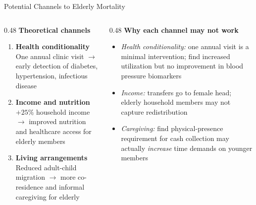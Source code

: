 \documentclass[aspectratio=169,usenames,dvipsnames]{beamer}
\begin{document}
\begin{frame}{Potential Channels to Elderly Mortality}\label{channels}
\small
\begin{columns}[T]
  \begin{column}{0.48\textwidth}
    \textbf{Theoretical channels}
    \vspace{4pt}
    \begin{enumerate}
      \item \textbf{Health conditionality} \\
        One annual clinic visit $\to$ early detection of diabetes, hypertension, infectious disease
      \vspace{8pt}
      \item \textbf{Income and nutrition} \\
        $+25\%$ household income $\to$ improved nutrition and healthcare access for elderly members
      \vspace{8pt}
      \item \textbf{Living arrangements} \\
        Reduced adult-child migration $\to$ more co-residence and informal caregiving for elderly
    \end{enumerate}
  \end{column}
  \begin{column}{0.48\textwidth}
    \textbf{Why each channel may not work}
    \vspace{4pt}
    \begin{itemize}
      \item[$\circ$] \textit{Health conditionality:} one annual visit is a minimal intervention; \cite{aguila2024conditional} find increased utilization but no improvement in blood pressure biomarkers
      \vspace{4pt}
      \item[$\circ$] \textit{Income:} transfers go to female head; elderly household members may not capture redistribution
      \vspace{4pt}
      \item[$\circ$] \textit{Caregiving:} \cite{BehrmanParker2013Demography} find physical-presence requirement for cash collection may actually \textit{increase} time demands on younger members
    \end{itemize}
  \end{column}
\end{columns}
\end{frame}

\end{document}
